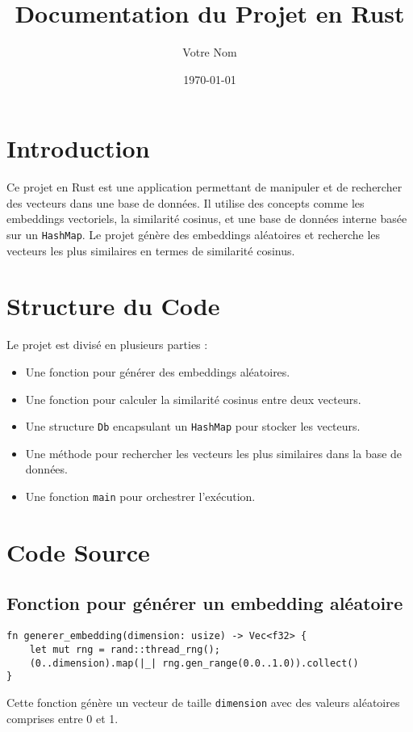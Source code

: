 \documentclass[a4paper,11pt]{article}
\title{Documentation du Projet en Rust}
\author{Votre Nom}
\date{\today}
\begin{document}
\maketitle

\section*{Introduction}
Ce projet en Rust est une application permettant de manipuler et de rechercher des vecteurs dans une base de données. Il utilise des concepts comme les embeddings vectoriels, la similarité cosinus, et une base de données interne basée sur un \texttt{HashMap}. Le projet génère des embeddings aléatoires et recherche les vecteurs les plus similaires en termes de similarité cosinus.

\section*{Structure du Code}
Le projet est divisé en plusieurs parties :
\begin{itemize}
    \item Une fonction pour générer des embeddings aléatoires.
    \item Une fonction pour calculer la similarité cosinus entre deux vecteurs.
    \item Une structure \texttt{Db} encapsulant un \texttt{HashMap} pour stocker les vecteurs.
    \item Une méthode pour rechercher les vecteurs les plus similaires dans la base de données.
    \item Une fonction \texttt{main} pour orchestrer l'exécution.
\end{itemize}

\section*{Code Source}

\subsection*{Fonction pour générer un embedding aléatoire}
\begin{verbatim}
fn generer_embedding(dimension: usize) -> Vec<f32> {
    let mut rng = rand::thread_rng();
    (0..dimension).map(|_| rng.gen_range(0.0..1.0)).collect()
}
\end{verbatim}

Cette fonction génère un vecteur de taille \texttt{dimension} avec des valeurs aléatoires comprises entre 0 et 1.
\end{document}
